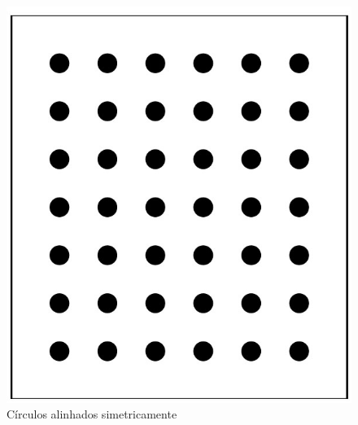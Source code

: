 \begin{figure}[!htb]
  \includegraphics[width=\linewidth]{Imagens/figura3-5.jpg}
  \caption{Círculos alinhados simetricamente}\label{fig3:5}
\endminipage
\end{figure}


